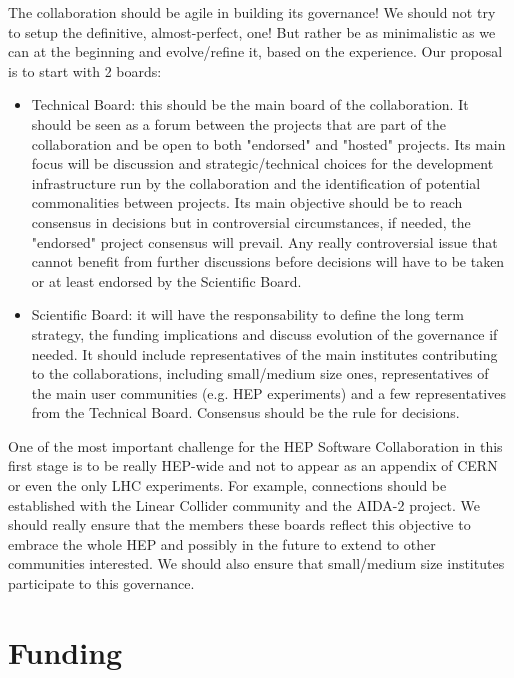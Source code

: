 \documentclass[11pt]{article} %
\begin{document}
The collaboration should be agile in building its governance! We should not try to setup the definitive, almost-perfect, one! But rather
be as minimalistic as we can at the beginning and evolve/refine it, based on the experience. Our proposal is to start with 2 boards:

\begin{itemize}

\item Technical Board: this should be the main board of the collaboration. It should be seen as a forum between the projects that are part
of the collaboration and be open to both "endorsed" and "hosted" projects. Its main focus will be discussion and strategic/technical choices for 
the development infrastructure run by the collaboration and the identification of potential commonalities between projects. Its main objective should
be to reach consensus in decisions but in controversial circumstances, if needed, the "endorsed" project consensus will prevail. Any really controversial
issue that cannot benefit from further discussions before decisions will have to be taken or at least endorsed by the Scientific Board.

\item Scientific Board: it will have the responsability to define the long term strategy, the funding implications and discuss evolution of the governance if
needed. It should include representatives of the main institutes contributing to the collaborations, including small/medium size ones, representatives of the main
user communities (e.g. HEP experiments) and a few representatives from the Technical Board. Consensus should be the rule for decisions.

\end{itemize}

One of the most important challenge for the HEP Software Collaboration in this first stage is to be really HEP-wide and not
to appear as an appendix of CERN or even the only LHC experiments. For example, connections should be established with the Linear Collider
community and the AIDA-2 project. We should really ensure that the members these boards reflect this objective to embrace the whole HEP
and possibly in the future to extend to other communities interested. We should also ensure that small/medium size institutes participate
to this governance.


\section{Funding}
\end{document}
